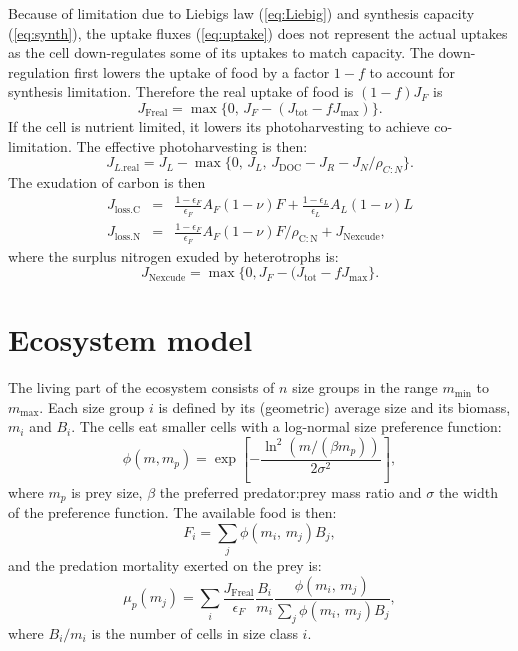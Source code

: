 \documentclass[11pt]{article}
\newcommand{\Jmax}[1][]{J_\mathrm{max}#1}
\begin{document}
Because of limitation due to Liebigs law (\ref{eq:Liebig}) and synthesis capacity (\ref{eq:synth}), the uptake fluxes (\ref{eq:uptake}) does not represent the actual uptakes as the cell down-regulates some of its uptakes to match capacity.  The down-regulation first lowers the uptake of food by a factor $1-f$ to account for synthesis limitation.  Therefore the real uptake of food is $(1-f) J_F$ is
\begin{equation}
  J_\mathrm{Freal} = \max\{0,\, J_F - (J_\mathrm{tot} - f \Jmax) \}.
\end{equation}
If the cell is nutrient limited, it lowers its photoharvesting to achieve co-limitation.  The effective photoharvesting is then:
\begin{equation}
  \label{eq:11}
  J_{L.\mathrm{real}} = J_L - \max\{0,\,J_L,\,  J_\mathrm{DOC} - J_R - J_N/\rho_{C:N}\}.
\end{equation}
The exudation of carbon is then
\begin{eqnarray}
  \label{eq:7}
  J_\mathrm{loss.C} &=& \frac{1-\epsilon_F}{\epsilon_F} A_F (1-\nu) F + \frac{1-\epsilon_L}{\epsilon_L} A_L (1-\nu) L \\
  J_\mathrm{loss.N} &=& \frac{1-\epsilon_F}{\epsilon_F} A_F (1-\nu) F/\rho_\mathrm{C:N} +  J_\mathrm{Nexcude},
\end{eqnarray}
where the surplus nitrogen exuded by heterotrophs is:
\begin{equation}
  \label{eq:13}
  J_\mathrm{Nexcude} = \max\{0, J_F - (J_\mathrm{tot} -f \Jmax \}.
\end{equation}


\section*{Ecosystem model}
The living part of the ecosystem consists of $n$ size groups in the range $m_\mathrm{min}$ to $m_\mathrm{max}$.  Each size group $i$ is defined by its (geometric) average size and its biomass, $m_i$ and $B_i$.  The cells eat smaller cells with a log-normal size preference function:
\begin{equation}
  \label{eq:6}
  \phi(m, m_p) = \exp \left[ - \frac{\ln^2(m/(\beta m_p))}{2 \sigma^2} \right],
\end{equation}
where $m_p$ is prey size, $\beta$ the preferred predator:prey mass ratio and $\sigma$ the width of the preference function.  The available food is then:
\begin{equation}
  \label{eq:8}
  F_i = \sum_j \phi(m_i,\, m_j) B_j,
\end{equation}
and the predation mortality exerted on the prey is:
\begin{equation}
  \label{mup}
  \mu_p(m_j) = \sum_i \frac{J_\mathrm{Freal}}{\epsilon_F} \frac{B_i}{m_i} \frac{ \phi(m_i,\,m_j) }{ \sum_j \phi(m_i,\,m_j) B_j },
\end{equation}
where $B_i/m_i$ is the number of cells in size class $i$.
\end{document}
